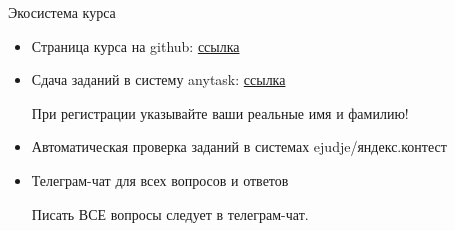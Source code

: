 \documentclass[11pt, fleqn, xcolor=x11names]{beamer}
\begin{document}
\begin{frame}{Экосистема курса}
\begin{itemize}
	\item Страница курса на github: \href{https://github.com/mmp-practicum-team/mmp_practicum_fall_2021}{ссылка}
	
	\item Сдача заданий в систему anytask: \href{https://anytask.org/course/830}{ссылка}
	
	При регистрации указывайте ваши реальные имя и фамилию!
	
	\item Автоматическая проверка заданий в системах ejudje/яндекс.контест
	
	\item Телеграм-чат для всех вопросов и ответов
	
	Писать ВСЕ вопросы следует в телеграм-чат.
\end{itemize}
\end{frame}
\end{document}
